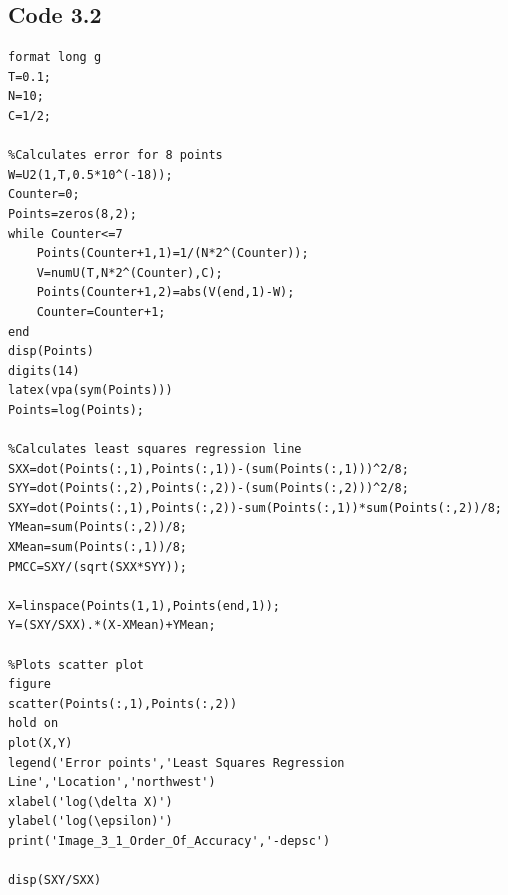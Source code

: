 \documentclass[10pt,a4paper,notitlepage]{article}
\begin{document}
\subsection*{\centering Code 3.2}\label{cd:3.2}
\begin{verbatim}
format long g
T=0.1;
N=10;
C=1/2;

%Calculates error for 8 points
W=U2(1,T,0.5*10^(-18));
Counter=0;
Points=zeros(8,2);
while Counter<=7
    Points(Counter+1,1)=1/(N*2^(Counter));
    V=numU(T,N*2^(Counter),C);
    Points(Counter+1,2)=abs(V(end,1)-W);
    Counter=Counter+1;
end
disp(Points)
digits(14)
latex(vpa(sym(Points)))
Points=log(Points);

%Calculates least squares regression line
SXX=dot(Points(:,1),Points(:,1))-(sum(Points(:,1)))^2/8;
SYY=dot(Points(:,2),Points(:,2))-(sum(Points(:,2)))^2/8;
SXY=dot(Points(:,1),Points(:,2))-sum(Points(:,1))*sum(Points(:,2))/8;
YMean=sum(Points(:,2))/8;
XMean=sum(Points(:,1))/8;
PMCC=SXY/(sqrt(SXX*SYY));

X=linspace(Points(1,1),Points(end,1));
Y=(SXY/SXX).*(X-XMean)+YMean;

%Plots scatter plot
figure
scatter(Points(:,1),Points(:,2))
hold on
plot(X,Y)
legend('Error points','Least Squares Regression Line','Location','northwest')
xlabel('log(\delta X)')
ylabel('log(\epsilon)')
print('Image_3_1_Order_Of_Accuracy','-depsc')

disp(SXY/SXX)
\end{verbatim}
\end{document}
